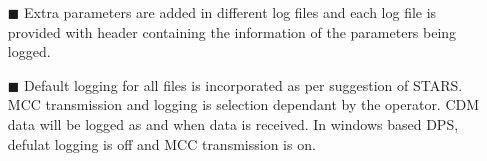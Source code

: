 \begin{enumerate}
	\item [$\blacksquare$] Extra parameters are added in different log files and each log file is provided with header containing the information of the parameters being logged.
	\item [$\blacksquare$] Default logging for all files is incorporated as per suggestion of STARS. MCC transmission and logging is selection dependant by the operator. CDM data will be logged as and when data is received. In windows based DPS, defulat logging is off and MCC transmission is on.  
\end{enumerate}